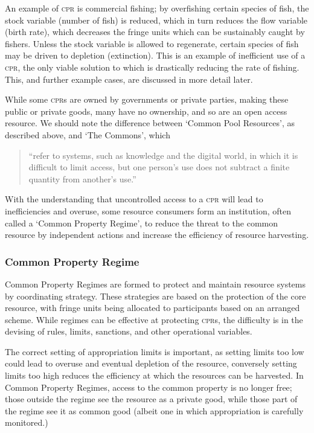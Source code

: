 An example of \textsc{cpr} is commercial fishing; by overfishing certain species of fish, the stock variable (number of fish) is reduced, which in turn reduces the flow variable (birth rate), which decreases the fringe units which can be sustainably caught by fishers. Unless the stock variable is allowed to regenerate, certain species of fish may be driven to depletion (extinction). This is an example of inefficient use of a \textsc{cpr}, the only viable solution to which is drastically reducing the rate of fishing. This, and further example cases, are discussed in more detail later.

While some \textsc{cpr}s are owned by governments or private parties, making these public or private goods, many have no ownership, and so are an open access resource. We should note the difference between `Common Pool Resources', as described above, and `The Commons', which

\begin{quote}
	``refer to systems, such as knowledge and the digital world, in which it is difficult to limit access, but one person's use does not subtract a finite quantity from another's use.''~\cite{Ostrom-challenge-90}
\end{quote}

With the understanding that uncontrolled access to a \textsc{cpr} will lead to inefficiencies and overuse, some resource consumers form an institution, often called a `Common Property Regime', to reduce the threat to the common resource by independent actions and increase the efficiency of resource harvesting.

\subsubsection{Common Property Regime}

Common Property Regimes are formed to protect and maintain resource systems by coordinating strategy. These strategies are based on the protection of the core resource, with fringe units being allocated to participants based on an arranged scheme. While regimes can be effective at protecting \textsc{cpr}s, the difficulty is in the devising of rules, limits, sanctions, and other operational variables.

The correct setting of appropriation limits is important, as setting limits too low could lead to overuse and eventual depletion of the resource, conversely setting limits too high reduces the efficiency at which the resources can be harvested. In Common Property Regimes, access to the common property is no longer free; those outside the regime see the resource as a private good, while those part of the regime see it as common good (albeit one in which appropriation is carefully monitored.)

